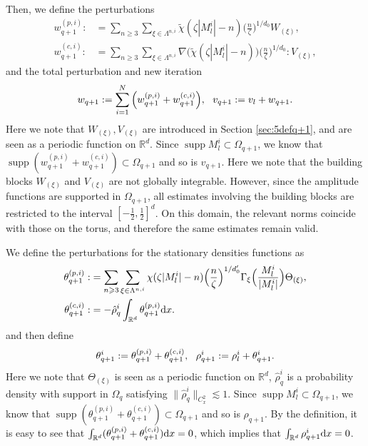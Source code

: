 \documentclass[UTF-8,reqno]{amsart}
\numberwithin{equation}{section}
\theoremstyle{definition}
\DeclareMathOperator{\supp}{supp}
\def\({{\Big(}}
\def\){{\Big)}}
\def\dif{{\mathord{{\rm d}}}}
\def\mR{{\mathbb R}}
\def\geq{\geqslant}
\def\({{\Big(}}
\def\){{\Big)}}
\def\dif{{\mathord{{\rm d}}}}
\def\geq{\geqslant}
\begin{document}
Then, we define the perturbations
\begin{align*}
w_{q+1}^{(p,i)}:&=\sum_{n\geq3}\sum_{\xi\in\Lambda^{n,i}}\tilde{\chi}(\zeta |M^i_l|-n)\(\frac{n}{\zeta }\)^{1/d_0}W_{ (\xi)},\\
w_{q+1}^{(c,i)}:&=\sum_{n\geq3}\sum_{\xi\in\Lambda^{n,i}}\nabla\( \tilde{\chi}(\zeta |M^i_l|-n) \)\(\frac{n}{\zeta }\)^{1/{d_0}}:V_{ (\xi)},
\end{align*}
 and the total perturbation and new iteration  
\begin{align}
w_{q+1}:=\sum_{i=1}^N\(w_{q+1}^{(p,i)}+w_{q+1}^{(c,i)}\),\ \ v_{q+1}:=v_l+w_{q+1}.\notag
\end{align} 
Here we note that $W_{ (\xi)},V_{ (\xi)}$ are introduced in Section \ref{sec:5defq+1}, and are seen as a periodic function on $\mathbb{R}^d$.
Since $\supp M_l^i\subset\Omega_{q+1}$, we know that $\supp (w_{q+1}^{(p,i)}+w_{q+1}^{(c,i)})\subset\Omega_{q+1}$ and so is $v_{q+1}$. Here we note that the building blocks $W_{(\xi)}$ and $V_{(\xi)}$ are not globally integrable. However, since the amplitude functions are supported in $\Omega_{q+1}$, all estimates involving the building blocks are restricted to the interval $[-\frac12,\frac12]^d$. On this domain, the relevant norms coincide with those on the torus, and therefore the same estimates remain valid. 




 
We define the perturbations for the stationary  densities functions as
\begin{align}
\theta_{q+1}^{(p,i)}:&=
\sum_{n\geq3}\sum_{\xi\in\Lambda^{n,i}}\chi(\zeta |M^i_l|-n)\(\frac{n}{\zeta }\)^{1/{d_0'}}\Gamma_{\xi}\(\frac{M^i_l}{|M^i_l|}\)\Theta_{ (\xi)},\notag\\
\theta_{q+1}^{(c,i)}:&=-\hat{\rho}^i_q\int_{\mathbb{R}^d} \theta_{q+1}^{(p,i)}\dif x.\notag
\end{align}
 and then define
\begin{align}
\theta _{q+1}^i:=\theta_{q+1}^{(p,i)}+\theta_{q+1}^{(c,i)},
\ \ 
  \rho^i_{q+1}:=  \rho^i_l+\theta^i _{q+1}.\notag
\end{align} 
Here we note that $\Theta_{ (\xi)}$ is seen as a periodic function on $\mathbb{R}^d$, $ \hat{\rho}^i_q$ is a probability density with support in $\Omega_{q}$ satisfying $\|\hat{\rho}^i_q\|_{C_{x}^2}\lesssim1.$    
Since $\supp M_l^i\subset\Omega_{q+1}$, we know that $\supp (\theta_{q+1}^{(p,i)}+\theta_{q+1}^{(c,i)})\subset\Omega_{q+1}$ and so is $\rho_{q+1}$. 
 By the definition, it is easy to see that $\int_{\mR^d}(\theta_{q+1}^{(p,i)}+\theta_{q+1}^{(c,i)})\dif x=0$, which implies that $\int_{\mR^d}\rho^{i}_{q+1}\dif x=0$.
\end{document}
